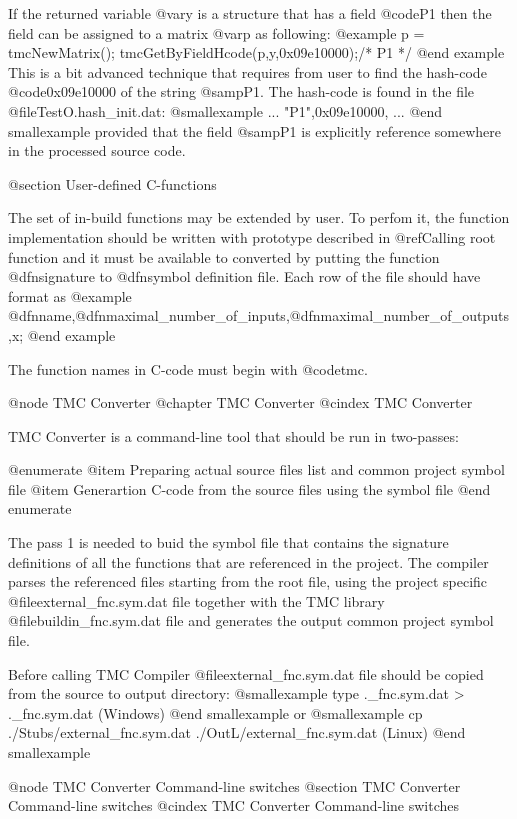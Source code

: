 If the returned variable @var{y} is a structure that has a field @code{P1} then the field can be assigned to a matrix @var{p} as following:
@example
p = tmcNewMatrix();
tmcGetByFieldHcode(p,y,0x09e10000);/* P1 */
@end example
This is a bit advanced technique that requires from user to find the hash-code @code{0x09e10000} of the string @samp{P1}. The hash-code is found in the file
@file{TestO.hash_init.dat}:
@smallexample
...
"P1",0x09e10000,
...
@end smallexample
provided that the field @samp{P1} is explicitly reference somewhere in the processed source code.


@section User-defined C-functions

The set of in-build functions may be extended by user.  To perfom it, the function implementation should be written with prototype described in  @ref{Calling root function} and
it must be available to converted by putting the function @dfn{signature} to @dfn{symbol definition file}. Each row of the file should have format as
@example
 @dfn{name},@dfn{maximal_number_of_inputs},@dfn{maximal_number_of_outputs},x;
@end example

The function names in C-code must begin with @code{tmc}. 



@node TMC Converter
@chapter TMC Converter
@cindex TMC Converter

TMC Converter is a command-line tool that  should be run in two-passes:

@enumerate
@item Preparing actual source files list and common project symbol file
@item Generartion C-code from the source files using the symbol file
@end enumerate

The pass 1 is needed to buid the symbol file that contains the signature definitions of all the functions that are referenced in the project. The compiler parses the referenced files starting from the root file,
 using the project specific @file{external_fnc.sym.dat} file together with the TMC library @file{buildin_fnc.sym.dat} file and generates the output common project symbol file. 

Before calling TMC Compiler  @file{external_fnc.sym.dat} file should be copied from the source to output directory:
@smallexample
  type .\Stubs\external_fnc.sym.dat > .\OutL\external_fnc.sym.dat (Windows)
@end smallexample
or
@smallexample
  cp ./Stubs/external_fnc.sym.dat  ./OutL/external_fnc.sym.dat (Linux)
@end smallexample

@node TMC Converter Command-line switches
@section TMC Converter Command-line switches
@cindex TMC Converter Command-line switches

